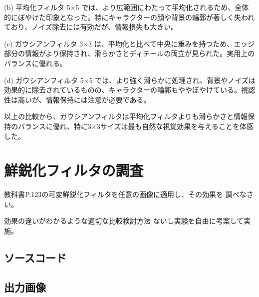 \documentclass[a4paper,11pt,titlepage]{jsarticle}
\begin{document}
(b) 平均化フィルタ 5×5 では、より広範囲にわたって平均化されるため、全体的にぼやけた印象となった。特にキャラクターの顔や背景の輪郭が著しく失われており、ノイズ除去には有効だが、情報損失も大きい。

(c) ガウシアンフィルタ 3×3 は、平均化と比べて中央に重みを持つため、エッジ部分の情報がより保持され、滑らかさとディテールの両立が見られた。実用上のバランスに優れる。

(d) ガウシアンフィルタ 5×5 では、より強く滑らかに処理され、背景やノイズは効果的に除去されているものの、キャラクターの輪郭もややぼやけている。視認性は高いが、情報保持には注意が必要である。

以上の比較から、ガウシアンフィルタは平均化フィルタよりも滑らかさと情報保持のバランスに優れ、特に3×3サイズは最も自然な視覚効果を与えることを体感した。


\section{鮮鋭化フィルタの調査}
教科書P.123の可変鮮鋭化フィルタを任意の画像に適用し、その効果を
調べなさい。

効果の違いがわかるような適切な比較検討方法
ないし実験を自由に考案して実施。

\subsection{ソースコード}


\subsection{出力画像}
\end{document}
